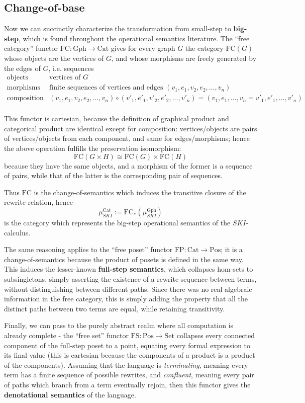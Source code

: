 \documentclass{amsart}
\theoremstyle{definition}
\newcommand{\Gph}{\mathrm{Gph}}
\newcommand{\Set}{\mathrm{Set}}
\newcommand{\Cat}{\mathrm{Cat}}
\newcommand{\Pos}{\mathrm{Pos}}
\newcommand{\FC}{\mathrm{FC}}
\newcommand{\FP}{\mathrm{FP}}
\newcommand{\FS}{\mathrm{FS}}
\newcommand{\maps}{\colon}
\begin{document}
\subsection{Change-of-base}
Now we can succinctly characterize the transformation from small-step to \textbf{big-step}, which is found throughout the operational semantics literature. The ``free category'' functor $\FC\maps \Gph \to \Cat$ gives for every graph $G$ the category $\FC(G)$ whose objects are the vertices of $G$, and whose morphisms are freely generated by the edges of $G$, i.e. sequences 
\[\begin{array}{rl}
\text{objects} & \text{vertices of } G\\
\text{morphisms} & \text{finite sequences of vertices and edges } (v_1,e_1,v_2,e_2,...,v_n)\\
\text{composition} & (v_1,e_1,v_2,e_2,...,v_n) \circ (v'_1,e'_1,v'_2,e'_2,...,v'_n) = (v_1,e_1,...,v_n=v'_1,e'_1,...,v'_n)\\
\end{array}\]

This functor is cartesian, because the definition of graphical product and categorical product are identical except for composition: vertices/objects are pairs of vertices/objects from each component, and same for edges/morphisms; hence the above operation fulfills the preservation isomorphism: $$\FC(G\times H) \cong \FC(G)\times \FC(H)$$ because they have the same objects, and a morphism of the former is a sequence of pairs, while that of the latter is the corresponding pair of sequences.

Thus $\FC$ is the change-of-semantics which induces the transitive closure of the rewrite relation, hence $$\mu_{SKI}^\Cat := \FC_*(\mu_{SKI}^\Gph)$$ is the category which represents the big-step operational semantics of the $SKI$-calculus.

The same reasoning applies to the ``free poset'' functor $\FP\maps \Cat \to \Pos$; it is a change-of-semantics because the product of posets is defined in the same way. This induces the lesser-known \textbf{full-step semantics}, which collapses hom-sets to subsingletons, simply asserting the existence of a rewrite sequence between terms, without distinguishing between different paths. Since there was no real algebraic information in the free category, this is simply adding the property that all the distinct paths between two terms are equal, while retaining transitivity.

Finally, we can pass to the purely abstract realm where all computation is already complete - the ``free set'' functor $\FS\maps \Pos \to \Set$ collapses every connected component of the full-step poset to a point, equating every formal expression to its final value (this is cartesian because the components of a product is a product of the components). Assuming that the language is \textit{terminating}, meaning every term has a finite sequence of possible rewrites, and \textit{confluent}, meaning every pair of paths which branch from a term eventually rejoin, then this functor gives the \textbf{denotational semantics} of the language.
\end{document}
